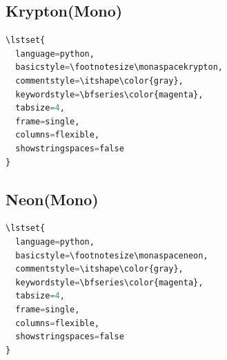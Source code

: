 \documentclass[a4paper]{scrartcl}
\begin{document}




\pagebreak

\subsection{Krypton(Mono)}

\begin{lstlisting}[language=python,basicstyle=\footnotesize\monaspacekrypton,commentstyle=\itshape\color{gray},keywordstyle=\bfseries\color{magenta},tabsize=4,frame=single,columns=flexible,showstringspaces=false]
\lstset{
  language=python,
  basicstyle=\footnotesize\monaspacekrypton,
  commentstyle=\itshape\color{gray},
  keywordstyle=\bfseries\color{magenta},
  tabsize=4,
  frame=single,
  columns=flexible,
  showstringspaces=false
}
\end{lstlisting}





\pagebreak

\subsection{Neon(Mono)}

\begin{lstlisting}[language=python,basicstyle=\footnotesize\monaspaceneon,commentstyle=\itshape\color{gray},keywordstyle=\bfseries\color{magenta},tabsize=4,frame=single,columns=flexible,showstringspaces=false]
\lstset{
  language=python,
  basicstyle=\footnotesize\monaspaceneon,
  commentstyle=\itshape\color{gray},
  keywordstyle=\bfseries\color{magenta},
  tabsize=4,
  frame=single,
  columns=flexible,
  showstringspaces=false
}
\end{lstlisting}
\end{document}
